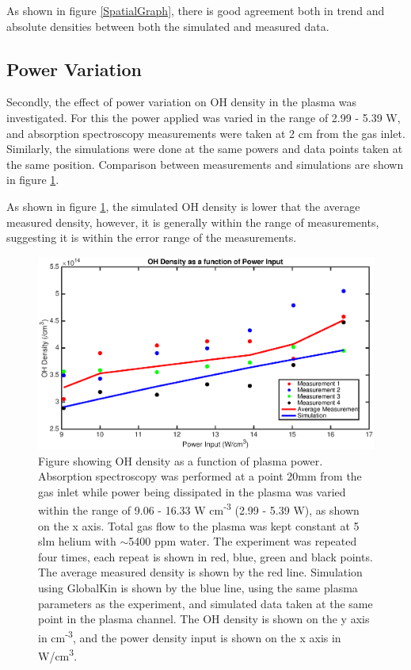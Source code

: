 \documentclass[11pt, oneside]{article}   	%
\begin{document}
As shown in figure \ref{SpatialGraph}, there is good agreement both in trend and absolute densities between both the simulated and measured data.

\subsection*{Power Variation}

Secondly, the effect of power variation on OH density in the plasma was investigated.
For this the power applied was varied in the range of 2.99 - 5.39 W, and absorption spectroscopy measurements were taken at 2 cm from the gas inlet.
Similarly, the simulations were done at the same powers and data points taken at the same position.
Comparison between measurements and simulations are shown in figure \ref{PowerVariation}.

As shown in figure \ref{PowerVariation}, the simulated OH density is lower that the average measured density, however, it is generally within the range of measurements, suggesting it is within the error range of the measurements.

\begin{figure}
\includegraphics[width=\textwidth]{Figures/PowerVariation}
\caption{Figure showing OH density as a function of plasma power. Absorption spectroscopy was performed at a point 20mm from the gas inlet while power being dissipated in the plasma was varied within the range of 9.06 - 16.33 W cm\textsuperscript{-3} (2.99 - 5.39 W), as shown on the x axis. Total gas flow to the plasma was kept constant at 5 slm helium with $\sim$5400 ppm water. The experiment was repeated four times, each repeat is shown in red, blue, green and black points. The average measured density is shown by the red line.
Simulation using GlobalKin is shown by the blue line, using the same plasma parameters as the experiment, and simulated data taken at the same point in the plasma channel.
The OH density is shown on the y axis in cm\textsuperscript{-3}, and the power density input is shown on the x axis in W/cm\textsuperscript{3}.}
\label{PowerVariation}
\end{figure}
\end{document}
